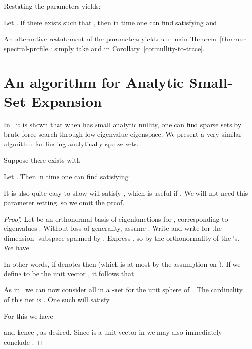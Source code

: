 \documentclass[11pt]{article}
\begin{document}
Restating the parameters yields:
\begin{corollary} \label{cor:alt-nullity-to-trace}
    Let . If there exists  such that , then in   time one can find  satisfying  and .
\end{corollary}

An alternative restatement of the parameters yields our main Theorem~\ref{thm:our-spectral-profile}:  simply take  and  in Corollary~\ref{cor:nullity-to-trace}.



\section{An algorithm for Analytic Small-Set Expansion}

In~\cite{ABS10} it is shown that when  has small analytic nullity, one can find sparse sets by brute-force search through low-eigenvalue eigenspace.
We present a very similar algorithm for finding analytically sparse sets.
\begin{lemma}                                     \label{lem:low-nullity}
    Suppose there exists  with
    
    Let .  Then in time  one can find  satisfying
    
\end{lemma}
\begin{remark}  It is also quite easy to show  will satisfy , which is useful if .  We will not need this parameter setting, so we omit the proof.  
\end{remark}
\begin{proof}
    Let  be an orthonormal basis of eigenfunctions for , corresponding to eigenvalues .  Without loss of generality, assume .  Write  and write  for the dimension- subspace spanned by .  Express , so  by the orthonormality of the 's.  We have
    
    In other words, if  denotes  then  (which is at most  by the assumption on ).  If we define  to be the unit vector , it follows that
    
    As in~\cite{ABS10} we can now consider all  in a -net for the unit sphere of~. The cardinality of this net is .  One such  will satisfy
    
    For this  we have
    
    and hence , as desired.  Since  is a unit vector in  we may also immediately conclude .
\end{proof}
\end{document}
